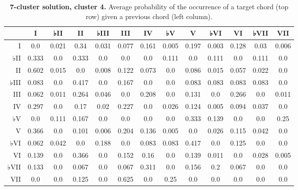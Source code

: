 \begin{table}[htbp]
\begin{minipage}{\linewidth}
\setlength{\tymax}{0.5\linewidth}
\centering
\small
\caption{\textbf{7-cluster solution, cluster 4.} Average probability of the occurrence of a target chord (top row) given a previous chord (left column).}
\label{7-clustersolutioncluster4.averageprobabilityoftheoccurrenceofatargetchordtoprowgivenapreviouschordleftcolumn.}
\begin{tabulary}{\textwidth}{@{}RCCCCCCCCCCCC@{}} \toprule
&I&♭II&II&♭III&III&IV&♭V&V&♭VI&VI&♭VII&VII\\
\midrule
I&0.0&0.021&0.34&0.031&0.077&0.161&0.005&0.197&0.003&0.128&0.03&0.006\\
♭II&0.333&0.0&0.333&0.0&0.0&0.0&0.111&0.0&0.111&0.0&0.111&0.0\\
II&0.602&0.015&0.0&0.008&0.122&0.073&0.0&0.086&0.015&0.057&0.022&0.0\\
♭III&0.083&0.0&0.417&0.0&0.167&0.0&0.0&0.083&0.083&0.083&0.083&0.0\\
III&0.062&0.011&0.264&0.046&0.0&0.208&0.0&0.131&0.0&0.266&0.0&0.011\\
IV&0.297&0.0&0.17&0.02&0.227&0.0&0.026&0.124&0.005&0.094&0.037&0.0\\
♭V&0.0&0.111&0.167&0.0&0.0&0.0&0.0&0.333&0.139&0.0&0.0&0.25\\
V&0.366&0.0&0.101&0.006&0.204&0.136&0.005&0.0&0.026&0.115&0.042&0.0\\
♭VI&0.062&0.042&0.0&0.188&0.0&0.083&0.083&0.417&0.0&0.125&0.0&0.0\\
VI&0.139&0.0&0.366&0.0&0.152&0.16&0.0&0.139&0.011&0.0&0.028&0.005\\
♭VII&0.133&0.0&0.067&0.0&0.067&0.311&0.0&0.156&0.2&0.067&0.0&0.0\\
VII&0.0&0.0&0.125&0.0&0.625&0.0&0.25&0.0&0.0&0.0&0.0&0.0\\

\bottomrule

\end{tabulary}
\end{minipage}
\end{table}

